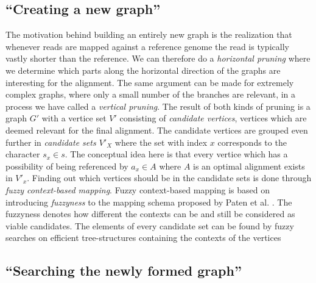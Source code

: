 \documentclass[thesis.tex]{subfiles}
\begin{document}
\subsection{``Creating a new graph''}
The motivation behind building an entirely new graph is the realization that whenever reads are mapped against a reference genome the read is typically vastly shorter than the reference. We can therefore do a \textit{horizontal pruning} where we determine which parts along the horizontal direction of the graphs are interesting for the alignment. The same argument can be made for extremely complex graphs, where only a small number of the branches are relevant, in a process we have called a \textit{vertical pruning}. The result of both kinds of pruning is a graph $G'$ with a vertice set $V'$ consisting of \textit{candidate vertices}, vertices which are deemed relevant for the final alignment. The candidate vertices are grouped even further in \textit{candidate  sets $V'_X$} where the set with index $x$ corresponds to the character $s_x \in s$. The conceptual idea here is that every vertice which has a possibility of being referenced by $a_x \in A$ where $A$ is an optimal alignment exists in $V'_x$. Finding out which vertices should be in the candidate sets is done through \textit{fuzzy context-based mapping}. Fuzzy context-based mapping is based on introducing \textit{fuzzyness} to the mapping schema proposed by Paten et al. \cite{mapping_to_a_reference_genome_structure}. The fuzzyness denotes how different the contexts can be and still be considered as viable candidates. The elements of every candidate set can be found by fuzzy searches on efficient tree-structures containing the contexts of the vertices
\subsection{``Searching the newly formed graph''}
\end{document}
